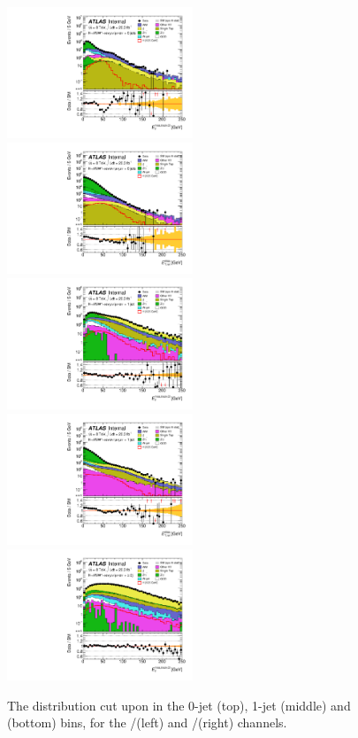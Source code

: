 \begin{figure}
	\includegraphics[width=0.495\textwidth]{tex/selection/emme_CutZVeto_0jet_MET_TrackHWW_Clj_mh125_log}
	\hfill
	\includegraphics[width=0.495\textwidth]{tex/selection/eemm_CutZVeto_0jet_METRel_mh125_log}
	\\
	\includegraphics[width=0.495\textwidth]{tex/selection/emme_CutZVeto_1jet_MET_TrackHWW_Clj_mh125_log}
	\hfill
	\includegraphics[width=0.495\textwidth]{tex/selection/eemm_CutZVeto_1jet_METRel_mh125_log}
	\\
	\includegraphics[width=0.495\textwidth]{tex/selection/emme_CutZVeto_2jetincl_MET_TrackHWW_Clj_mh125_log}
	\hfill\null
	\caption{The \met distribution cut upon in the 0-jet (top), 1-jet (middle) and 
	\twojet (bottom) bins, for the \emch/\mech (left) and \eech/\mmch (right) channels.}
	\label{fig:sel:met}
\end{figure}

